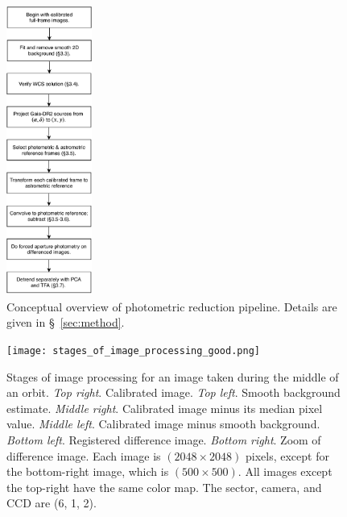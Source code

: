 \documentclass[12pt,twocolumn,tighten]{aastex62}
\begin{document}
\begin{figure}[!t]
	\begin{center}
		\leavevmode
		\includegraphics[width=0.25\textwidth]{pipelineoverview.pdf}
	\end{center}
	\vspace{-0.2cm}
	\caption{
    Conceptual overview of photometric reduction pipeline.
    Details are given in \S~\ref{sec:method}.
	\label{fig:pipeline}
	}
\end{figure}

\begin{figure}[!t]
    \begin{center}
        \leavevmode
        \texttt{[image: stages\_of\_image\_processing\_good.png]}
    \end{center}
    \vspace{-0.6cm}
    \caption{
        Stages of image processing for an image taken during the middle
        of an orbit.
        {\it Top right}. Calibrated image.
        {\it Top left}. Smooth background estimate.
        {\it Middle right}. Calibrated image minus its median pixel value.
        {\it Middle left}. Calibrated image minus smooth background.
        {\it Bottom left}. Registered difference image.
        {\it Bottom right}. Zoom of difference image.
        Each image is $(2048\times2048)$ pixels, except for the bottom-right 
        image, which is $(500\times500)$.
        All images except the top-right have the same color map.
        The sector, camera, and CCD are (6, 1, 2).
        \label{fig:stages_good}
    }
\end{figure}
\end{document}
